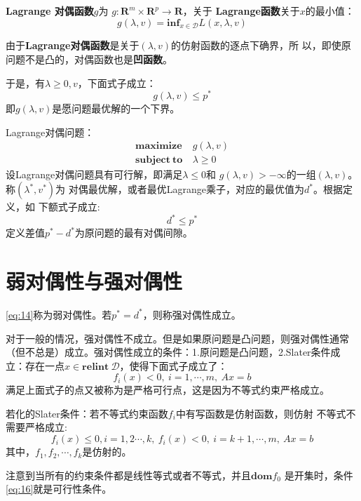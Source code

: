 \documentclass[fontset=none,oneside]{book}
\begin{document}
{\bf{Lagrange 对偶函数}}$g$为
$g:\mathbf{R}^{m}\times\mathbf{R}^{p}\rightarrow\mathbf{R}$，关于
{\bf{Lagrange函数}}关于$x$的最小值：
\begin{equation}
\label{eq:11}
g(\lambda,v)=\mathbf{inf}_{x\in\mathcal{D}}L(x,\lambda,v)
\end{equation}
\begin{shaded}
由于{\bf{Lagrange对偶函数}}是关于$(\lambda,v)$的仿射函数的逐点下确界，所
以，即使原问题不是凸的，对偶函数也是{\bf{凹函数}}。
\end{shaded}
于是，有$\lambda\geq 0, v$，下面式子成立：
\begin{equation}
\label{eq:12}
g(\lambda,v)\leq p^{*}
\end{equation}
即$g(\lambda,v)$是愿问题最优解的一个下界。

Lagrange对偶问题：
\begin{equation}
\label{eq:13}
\begin{split}
\mathbf{maximize ~ }& g(\lambda,v) \\
\mathbf{subject~to~}& \lambda\geq 0
\end{split}
\end{equation}
设Lagrange对偶问题具有可行解，即满足$\lambda\leq 0$和
$g(\lambda,v)>-\infty$的一组$(\lambda,v)$。称$(\lambda^{*},v^{*})$为
对偶最优解，或者最优Lagrange乘子，对应的最优值为$d^{*}$。根据定义，如
下额式子成立:
\begin{equation}
\label{eq:14}
d^{*}\leq p^{*}
\end{equation}
定义差值$p^{*}-d^{*}$为原问题的最有对偶间隙。
\section{弱对偶性与强对偶性}
\eqref{eq:14}称为弱对偶性。若$p^{*}=d^{*}$，则称强对偶性成立。

对于一般的情况，强对偶性不成立。但是如果原问题是凸问题，则强对偶性通常
（但不总是）成立。强对偶性成立的条件：1.原问题是凸问题，2.Slater条件成
立：存在一点$x\in \mathbf{relint}~\mathcal{D}$，使得下面式子成立了：
\begin{equation}
\label{eq:15}
f_{i}(x)<0,~i=1,\cdots,m, ~ Ax=b
\end{equation}
满足上面式子的点又被称为是严格可行点，这是因为不等式约束严格成立。

若化的Slater条件：若不等式约束函数$f_{i}$中有写函数是仿射函数，则仿射
不等式不需要严格成立:
\begin{equation}
\label{eq:16}
f_{i}(x)\leq 0,i=1,2\cdots,k,~f_{i}(x)<0,~i=k+1,\cdots,m,~Ax=b
\end{equation}
其中，$f_{1},f_{2},\cdots,f_{k}$是仿射的。
\begin{shaded}
注意到当所有的约束条件都是线性等式或者不等式，并且$\mathbf{dom} f_{0}$
是开集时，条件\eqref{eq:16}就是可行性条件。
\end{shaded}
\end{document}
